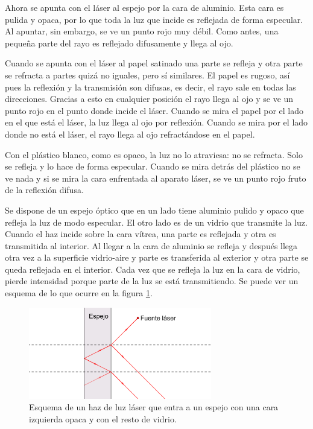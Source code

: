 \documentclass[12pt]{article}
\numberwithin{table}{section}
\numberwithin{figure}{section}
\numberwithin{equation}{section}
\begin{document}
Ahora se apunta con el láser al espejo por la cara de aluminio. Esta cara es pulida y opaca, por lo que toda la luz que incide es reflejada de forma especular. Al apuntar, sin embargo, se ve un punto rojo muy débil. Como antes, una pequeña parte del rayo es reflejado difusamente y llega al ojo.

Cuando se apunta con el láser al papel satinado una parte se refleja y otra parte se refracta a partes quizá no iguales, pero sí similares. El papel es rugoso, así pues la reflexión y la transmisión son difusas, es decir, el rayo sale en todas las direcciones. Gracias a esto en cualquier posición el rayo llega al ojo y se ve un punto rojo en el punto donde incide el láser. Cuando se mira el papel por el lado en el que está el láser, la luz llega al ojo por reflexión. Cuando se mira por el lado donde no está el láser, el rayo llega al ojo refractándose en el papel.

Con el plástico blanco, como es opaco, la luz no lo atraviesa: no se refracta. Solo se refleja y lo hace de forma especular. Cuando se mira detrás del plástico no se ve nada y si se mira la cara enfrentada al aparato láser, se ve un punto rojo fruto de la reflexión difusa.

Se dispone de un espejo óptico que en un lado tiene aluminio pulido y opaco que refleja la luz de modo especular. El otro lado es de un vidrio que transmite la luz. Cuando el haz incide sobre la cara vítrea, una parte es reflejada y otra es transmitida al interior. Al llegar a la cara de aluminio se refleja y después llega otra vez a la superficie vidrio-aire y parte es transferida al exterior y otra parte se queda reflejada en el interior. Cada vez que se refleja la luz en la cara de vidrio, pierde intensidad porque parte de la luz se está transmitiendo. Se puede ver un esquema de lo que ocurre en la figura \ref{P2espejo}.

\begin{figure}[!ht]
	\small \centering \sffamily
	\begin{center}
		\includegraphics[width=8cm]{P2Espejo.png}
		\caption{Esquema de un haz de luz láser que entra a un espejo con una cara izquierda opaca y con el resto de vidrio.}
		\label{P2espejo}
	\end{center}
\end{figure}
\end{document}
